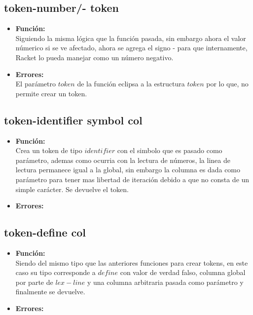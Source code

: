 \documentclass{article}
\begin{document}
\subsection{token-number/- token}
\begin{itemize}
    \item \textbf{Función:} \\
    Siguiendo la misma lógica que la función pasada, sin embargo ahora el valor númerico si se ve afectado, ahora se agrega el signo - para que internamente, Racket lo pueda manejar como un número negativo.
    \item \textbf{Errores:} \\
    El parámetro $token$ de la función eclipsa a la estructura $token$ por lo que, no permite crear un token.
\end{itemize}
\subsection{token-identifier symbol col}
\begin{itemize}
    \item \textbf{Función:} \\
    Crea un token de tipo $identifier$ con el simbolo que es pasado como parámetro, ademas como ocurria con la lectura de números, la linea de lectura permanece igual a la global, sin embargo la columna es dada como parámetro para tener mas libertad de iteración debido a que no consta de un simple carácter. Se devuelve el token.
    \item \textbf{Errores:} \\
\end{itemize}
\subsection{token-define col}
\begin{itemize}
    \item \textbf{Función:} \\
    Siendo del mismo tipo que las anteriores funciones para crear tokens, en este caso su tipo corresponde a $define$ con valor de verdad falso, columna global por parte de $lex-line$ y una columna arbitraria pasada como parámetro y finalmente se devuelve.
    \item \textbf{Errores:} \\ 
\end{itemize}
\end{document}

